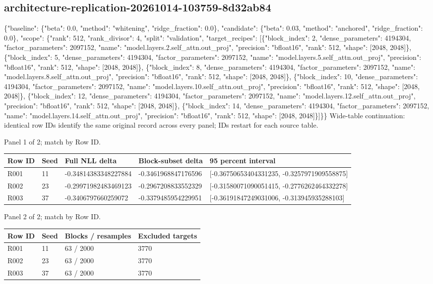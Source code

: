 \documentclass[10pt]{article}
\begin{document}
\subsection{architecture-replication-20261014-103759-8d32ab84}
\{"baseline": \{"beta": 0.0, "method": "whitening", "ridge\_fraction": 0.0\}, "candidate": \{"beta": 0.03, "method": "anchored", "ridge\_fraction": 0.0\}, "scope": \{"rank": 512, "rank\_divisor": 4, "split": "validation", "target\_recipes": [\{"block\_index": 2, "dense\_parameters": 4194304, "factor\_parameters": 2097152, "name": "model.layers.2.self\_attn.out\_proj", "precision": "bfloat16", "rank": 512, "shape": [2048, 2048]\}, \{"block\_index": 5, "dense\_parameters": 4194304, "factor\_parameters": 2097152, "name": "model.layers.5.self\_attn.out\_proj", "precision": "bfloat16", "rank": 512, "shape": [2048, 2048]\}, \{"block\_index": 8, "dense\_parameters": 4194304, "factor\_parameters": 2097152, "name": "model.layers.8.self\_attn.out\_proj", "precision": "bfloat16", "rank": 512, "shape": [2048, 2048]\}, \{"block\_index": 10, "dense\_parameters": 4194304, "factor\_parameters": 2097152, "name": "model.layers.10.self\_attn.out\_proj", "precision": "bfloat16", "rank": 512, "shape": [2048, 2048]\}, \{"block\_index": 12, "dense\_parameters": 4194304, "factor\_parameters": 2097152, "name": "model.layers.12.self\_attn.out\_proj", "precision": "bfloat16", "rank": 512, "shape": [2048, 2048]\}, \{"block\_index": 14, "dense\_parameters": 4194304, "factor\_parameters": 2097152, "name": "model.layers.14.self\_attn.out\_proj", "precision": "bfloat16", "rank": 512, "shape": [2048, 2048]\}]\}\}
Wide-table continuation: identical row IDs identify the same original record across every panel; IDs restart for each source table.
\par\noindent Panel 1 of 2; match by Row ID.
{\scriptsize\setlength{\tabcolsep}{2pt}
\begin{longtable}{p{}p{}p{}p{}p{}}
Row ID & Seed & Full NLL delta & Block-subset delta & 95 percent interval \\
\hline\endhead
R001 & 11 & -0.34814383348227884 & -0.3461968847176596 & [-0.36750653404331235, -0.3257971909558875] \\
R002 & 23 & -0.29971982483469123 & -0.2967208833552329 & [-0.31580071090051415, -0.2776262464332278] \\
R003 & 37 & -0.3406797660259072 & -0.3379485954229951 & [-0.36191847249031006, -0.313945935288103] \\
\end{longtable}}
\par\noindent Panel 2 of 2; match by Row ID.
{\scriptsize\setlength{\tabcolsep}{2pt}
\begin{longtable}{p{}p{}p{}p{}}
Row ID & Seed & Blocks / resamples & Excluded targets \\
\hline\endhead
R001 & 11 & 63 / 2000 & 3770 \\
R002 & 23 & 63 / 2000 & 3770 \\
R003 & 37 & 63 / 2000 & 3770 \\
\end{longtable}}
\end{document}
